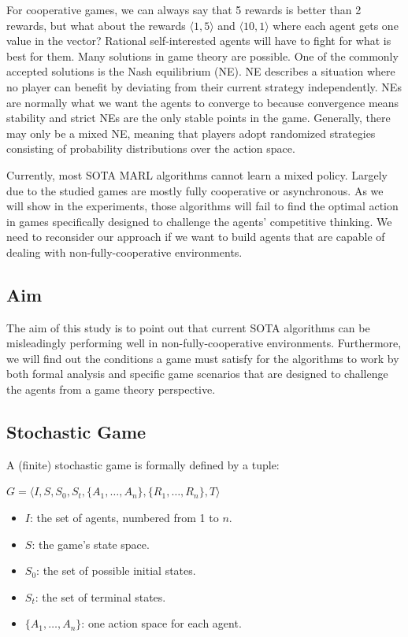 \documentclass[a4paper]{article}
\begin{document}
\begin{multicols}{2}
For cooperative games, we can always say that 5 rewards is better than 2 rewards, but what about the rewards $\langle 1,5 \rangle$ and  $\langle 10,1 \rangle$ where each agent gets one value in the vector? Rational self-interested agents will have to fight for what is best for them. Many solutions in game theory are possible. One of the commonly accepted solutions is the Nash equilibrium (NE). NE describes a situation where no player can benefit by deviating from their current strategy independently. NEs are normally what we want the agents to converge to because convergence means stability and strict NEs are the only stable points in the game. Generally, there may only be a mixed NE, meaning that players adopt randomized strategies consisting of probability distributions over the action space.

Currently, most SOTA MARL algorithms cannot learn a mixed policy. Largely due to the studied games are mostly fully cooperative or asynchronous. As we will show in the experiments, those algorithms will fail to find the optimal action in games specifically designed to challenge the agents' competitive thinking. We need to reconsider our approach if we want to build agents that are capable of dealing with non-fully-cooperative environments.

\subsection{Aim}
The aim of this study is to point out that current SOTA algorithms can be misleadingly performing well in non-fully-cooperative environments. Furthermore, we will find out the conditions a game must satisfy for the algorithms to work by both formal analysis and specific game scenarios that are designed to challenge the agents from a game theory perspective.

\subsection{Stochastic Game}

A (finite) stochastic game is formally defined by a tuple:

$G = \langle I,S,S_0,S_t,\{A_1,\ldots,A_n\},\{R_1,\ldots,R_n\},T \rangle$
\begin{itemize}
    \item $I$: the set of agents, numbered from 1 to $n$.
    \item $S$: the game’s state space.
    \item $S_0$: the set of possible initial states.
    \item $S_t$: the set of terminal states.
    \item $\{A_1,\ldots,A_n\}$: one action space for each agent.


\end{itemize}
\end{multicols}
\end{document}
